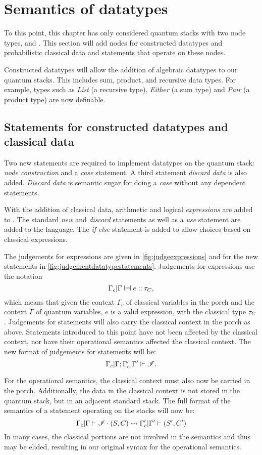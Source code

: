 \section{Semantics of datatypes}\label{sec:semanticsdatatypes}
To this point, this chapter has only considered quantum stacks with
two node types, \bit{} and \qbit{}. This section will add nodes for
constructed datatypes and  probabilistic classical data and statements
that operate on these nodes.

Constructed datatypes will allow the addition of algebraic datatypes
to our quantum stacks. This includes   sum, product,  and recursive 
data types. For example, types
such as \emph{List} (a recursive type), \emph{Either} (a sum type)
and \emph{Pair} (a product type) are now definable. 

\subsection{Statements for constructed  datatypes and classical data}
Two new statements are required to implement datatypes on the
quantum stack: \emph{node construction} and a \emph{case} statement. 
A third statement \emph{discard data} is also added. \emph{Discard data}
 is semantic sugar for doing a \emph{case} without any
dependent statements.

With the addition of classical data, arithmetic and logical 
\emph{expressions} are  added to \lqpl{}. 
The standard \emph{new} and \emph{discard} statements
as well as a \emph{use} statement are added to the language. The
\emph{if-else} statement is added to allow choices based on
classical expressions.

The judgements for expressions are given in \ref{fig:judgeexpressions}
and for the new statements 
in \ref{fig:judgementdatatypestatements}. Judgements for expressions
use the notation
\[\Gamma_c|\Gamma \Vdash\!\!\dashv e::\tau_C,\]
which means that given the context $\Gamma_c$ of 
classical variables in the porch and the context $\Gamma$ of
quantum variables, $e$ is a valid expression, with the classical
type $\tau_C$. Judgements for statements
will also carry the classical context in the porch as above. Statements
introduced to this point have not been affected by the classical context,
nor have their operational semantics affected the classical context.
The new format of judgements for statements will be:
\[ \Gamma_c | \Gamma ; \Gamma_c'|\Gamma' \Vdash \mathscr{I}.\]

For the operational semantics, the classical context must also now
be carried in the porch. Additionally, the data in the classical context
is not stored in the quantum stack, but in an adjacent standard stack. The
full format of the semantics of a statement operating on the 
stacks  will now be:
\[ {\Gamma_c | \Gamma \vdash {\ensuremath{\mathscr{I}}}\cdot{(S,C)}}\overset{}{\leadsto}{\Gamma_c' |\Gamma' \vdash (S',C')}
\]
In many cases, the classical portions are not involved in the
semantics and thus may be elided, resulting in
our original syntax for the operational semantics.

